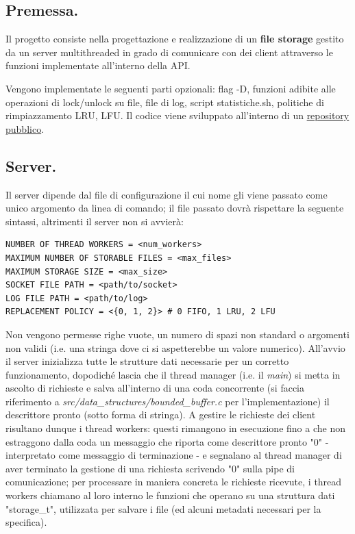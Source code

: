 \documentclass[11pt, italian, openany]{book}
\begin{document}
\begin{sloppypar}
\subsection{Premessa.}
Il progetto consiste nella progettazione e realizzazione di un \textbf{file storage} gestito da un server multithreaded in grado
di comunicare con dei client attraverso le funzioni implementate all'interno della API.

Vengono implementate le seguenti parti opzionali: flag -D, funzioni adibite alle operazioni di lock/unlock su file,
file di log, script statistiche.sh, politiche di rimpiazzamento LRU, LFU. Il codice viene sviluppato all'interno di un
\href{https://github.com/liviusi/SOL-Progetto-20-21}{repository pubblico}.

\subsection{Server.}
Il server dipende dal file di configurazione il cui nome gli viene passato come unico argomento da linea di comando;
il file passato dovr\`a rispettare la seguente sintassi, altrimenti il server non si avvier\`a:
\begin{lstlisting}[style=code]
NUMBER OF THREAD WORKERS = <num_workers>
MAXIMUM NUMBER OF STORABLE FILES = <max_files>
MAXIMUM STORAGE SIZE = <max_size>
SOCKET FILE PATH = <path/to/socket>
LOG FILE PATH = <path/to/log>
REPLACEMENT POLICY = <{0, 1, 2}> # 0 FIFO, 1 LRU, 2 LFU
\end{lstlisting}
Non vengono permesse righe vuote, un numero di spazi non standard o argomenti non validi (i.e. una stringa dove ci si aspetterebbe
un valore numerico). All'avvio il server inizializza tutte le strutture dati necessarie per un corretto funzionamento, dopodich\'e
lascia che il thread manager (i.e. il \textit{main}) si metta in ascolto di richieste e salva all'interno di una coda concorrente
(si faccia riferimento a \textit{src/data\_structures/bounded\_buffer.c} per l'implementazione) il descrittore pronto (sotto forma di stringa). A
gestire le richieste dei client risultano dunque i thread workers: questi rimangono in esecuzione fino a che non estraggono dalla
coda un messaggio che riporta come descrittore pronto "0" - interpretato come messaggio di terminazione - e segnalano
al thread manager di aver terminato la gestione di una richiesta scrivendo "0" sulla pipe di comunicazione; per processare in
maniera concreta le richieste ricevute, i thread workers chiamano al loro interno le funzioni che operano su una struttura dati
"storage\_t", utilizzata per salvare i file (ed alcuni metadati necessari per la specifica).


\end{sloppypar}
\end{document}
